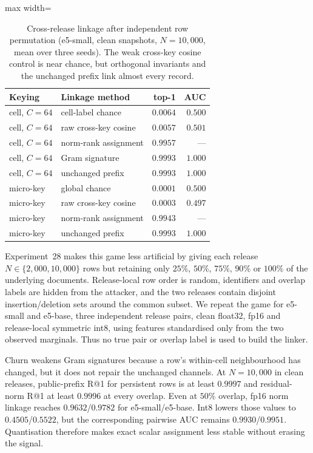 \begin{table}[tbp]
\begin{singlespace}
\centering
\caption{Cross-release linkage after independent row permutation
(e5-small, clean snapshots, $N=10{,}000$, mean over three seeds). The weak
cross-key cosine control is near chance, but orthogonal invariants and the
unchanged prefix link almost every record.}
\label{tab:shard-micro}
\small
\begin{adjustbox}{max width=\linewidth}
\begin{tabular}{@{}llrr@{}}
\toprule
Keying & Linkage method & top-1 & AUC \\ \midrule
cell, $C{=}64$ & cell-label chance & $0.0064$ & $0.500$ \\
cell, $C{=}64$ & raw cross-key cosine & $0.0057$ & $0.501$ \\
cell, $C{=}64$ & norm-rank assignment & $0.9957$ & --- \\
cell, $C{=}64$ & Gram signature & $0.9993$ & $1.000$ \\
cell, $C{=}64$ & unchanged prefix & $0.9993$ & $1.000$ \\ \midrule
micro-key & global chance & $0.0001$ & $0.500$ \\
micro-key & raw cross-key cosine & $0.0003$ & $0.497$ \\
micro-key & norm-rank assignment & $0.9943$ & --- \\
micro-key & unchanged prefix & $0.9993$ & $1.000$ \\
\bottomrule
\end{tabular}
\end{adjustbox}
\end{singlespace}
\end{table}

Experiment~28 makes this game less artificial by giving each release
$N\in\{2{,}000,10{,}000\}$ rows but retaining only $25\%$, $50\%$, $75\%$,
$90\%$ or $100\%$ of the underlying documents. Release-local row order is
random, identifiers and overlap labels are hidden from the attacker, and the
two releases contain disjoint insertion/deletion sets around the common
subset. We repeat the game for e5-small and e5-base, three independent
release pairs, clean float32, fp16 and release-local symmetric int8, using
features standardised only from the two observed marginals. Thus no true pair
or overlap label is used to build the linker.

Churn weakens Gram signatures because a row's within-cell neighbourhood has
changed, but it does not repair the unchanged channels. At $N=10{,}000$ in
clean releases, public-prefix R@1 for persistent rows is at least $0.9997$ and
residual-norm R@1 at least $0.9996$ at every overlap. Even at $50\%$ overlap,
fp16 norm linkage reaches $0.9632$/$0.9782$ for e5-small/e5-base. Int8 lowers
those values to $0.4505$/$0.5522$, but the corresponding pairwise AUC remains
$0.9930$/$0.9951$. Quantisation therefore makes exact scalar assignment less
stable without erasing the signal.

